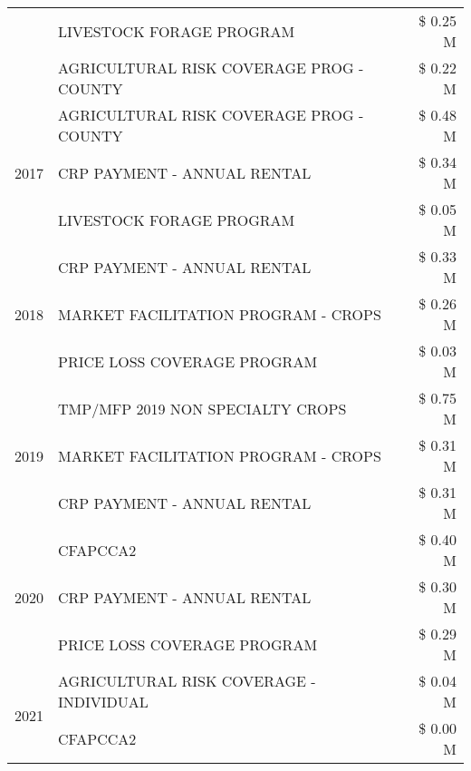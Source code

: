 \begin{tabular}{llr}
 & LIVESTOCK FORAGE PROGRAM & \$ 0.25 M \\
 & AGRICULTURAL RISK COVERAGE PROG - COUNTY & \$ 0.22 M \\
\cline{1-3}
\multirow[t]{3}{*}{2017} & AGRICULTURAL RISK COVERAGE PROG - COUNTY & \$ 0.48 M \\
 & CRP PAYMENT - ANNUAL RENTAL & \$ 0.34 M \\
 & LIVESTOCK FORAGE PROGRAM & \$ 0.05 M \\
\cline{1-3}
\multirow[t]{3}{*}{2018} & CRP PAYMENT - ANNUAL RENTAL & \$ 0.33 M \\
 & MARKET FACILITATION PROGRAM - CROPS & \$ 0.26 M \\
 & PRICE LOSS COVERAGE PROGRAM & \$ 0.03 M \\
\cline{1-3}
\multirow[t]{3}{*}{2019} & TMP/MFP 2019 NON SPECIALTY CROPS & \$ 0.75 M \\
 & MARKET FACILITATION PROGRAM - CROPS & \$ 0.31 M \\
 & CRP PAYMENT - ANNUAL RENTAL & \$ 0.31 M \\
\cline{1-3}
\multirow[t]{3}{*}{2020} & CFAPCCA2 & \$ 0.40 M \\
 & CRP PAYMENT - ANNUAL RENTAL & \$ 0.30 M \\
 & PRICE LOSS COVERAGE PROGRAM & \$ 0.29 M \\
\cline{1-3}
\multirow[t]{2}{*}{2021} & AGRICULTURAL RISK COVERAGE - INDIVIDUAL & \$ 0.04 M \\
 & CFAPCCA2 & \$ 0.00 M \\
\cline{1-3}
\bottomrule
\end{tabular}
